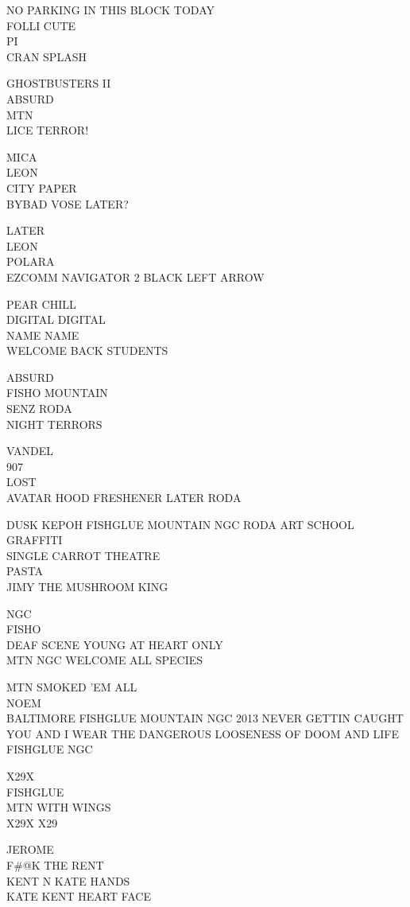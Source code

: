 \documentclass[10pt,letterpaper]{article}
\begin{document}
NO PARKING IN THIS BLOCK TODAY\\
FOLLI CUTE\\
PI\\
CRAN SPLASH

GHOSTBUSTERS II\\
ABSURD\\
MTN\\
LICE TERROR!

MICA\\
LEON\\
CITY PAPER\\
BYBAD VOSE LATER?

LATER\\
LEON\\
POLARA\\
EZCOMM NAVIGATOR 2 BLACK LEFT ARROW

PEAR CHILL\\
DIGITAL DIGITAL\\
NAME NAME\\
WELCOME BACK STUDENTS

ABSURD\\
FISHO MOUNTAIN\\
SENZ RODA\\
NIGHT TERRORS

VANDEL\\
907\\
LOST\\
AVATAR HOOD FRESHENER LATER RODA

DUSK KEPOH FISHGLUE MOUNTAIN NGC RODA ART SCHOOL GRAFFITI\\
SINGLE CARROT THEATRE\\
PASTA\\
JIMY THE MUSHROOM KING

NGC\\
FISHO\\
DEAF SCENE YOUNG AT HEART ONLY\\
MTN NGC WELCOME ALL SPECIES

MTN SMOKED 'EM ALL\\
NOEM\\
BALTIMORE FISHGLUE MOUNTAIN NGC 2013 NEVER GETTIN CAUGHT\\
YOU AND I WEAR THE DANGEROUS LOOSENESS OF DOOM AND LIFE FISHGLUE NGC

X29X\\
FISHGLUE\\
MTN WITH WINGS\\
X29X X29

JEROME\\
F\#@K THE RENT\\
KENT N KATE HANDS\\
KATE KENT HEART FACE
\end{document}
